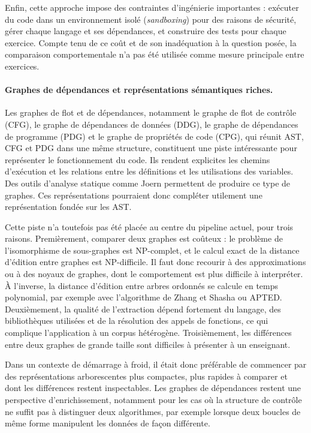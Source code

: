 Enfin, cette approche impose des contraintes d'ingénierie importantes :
exécuter du code dans un environnement isolé (\emph{sandboxing}) pour des
raisons de sécurité, gérer chaque langage et ses dépendances, et construire
des tests pour chaque exercice. Compte tenu de ce coût et de son inadéquation
à la question posée, la comparaison comportementale n'a pas été utilisée
comme mesure principale entre exercices.

\paragraph{Graphes de dépendances et représentations sémantiques riches.}

Les graphes de flot et de dépendances, notamment le graphe de flot de
contrôle (CFG), le graphe de dépendances de données (DDG), le graphe de
dépendances de programme (PDG) et le graphe de propriétés de code (CPG), qui
réunit AST, CFG et PDG dans une même structure, constituent une piste
intéressante pour représenter le fonctionnement du code. Ils rendent
explicites les chemins d'exécution et les relations entre les définitions et
les utilisations des variables. Des outils d'analyse statique comme Joern
permettent de produire ce type de graphes. Ces représentations pourraient
donc compléter utilement une représentation fondée sur les AST.

Cette piste n'a toutefois pas été placée au centre du pipeline actuel, pour
trois raisons. Premièrement, comparer deux graphes est coûteux : le problème
de l'isomorphisme de sous-graphes est NP-complet, et le calcul exact de la
distance d'édition entre graphes est NP-difficile. Il faut donc recourir à
des approximations ou à des noyaux de graphes, dont le comportement est plus
difficile à interpréter. À l'inverse, la distance d'édition entre arbres
ordonnés se calcule en temps polynomial, par exemple avec l'algorithme de
Zhang et Shasha ou APTED. Deuxièmement, la qualité de l'extraction dépend
fortement du langage, des bibliothèques utilisées et de la résolution des
appels de fonctions, ce qui complique l'application à un corpus hétérogène.
Troisièmement, les différences entre deux graphes de grande taille sont
difficiles à présenter à un enseignant.

Dans un contexte de démarrage à froid, il était donc préférable de commencer
par des représentations arborescentes plus compactes, plus rapides à comparer
et dont les différences restent inspectables. Les graphes de dépendances
restent une perspective d'enrichissement, notamment pour les cas où la
structure de contrôle ne suffit pas à distinguer deux algorithmes, par
exemple lorsque deux boucles de même forme manipulent les données de façon
différente.

